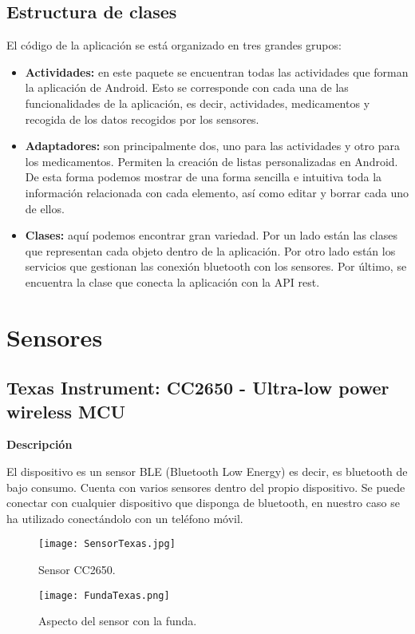 \documentclass[11pt,spanish]{article}
\begin{document}
\subsection{Estructura de clases}
El código de la aplicación se está organizado en tres grandes grupos:

\begin{itemize}
	\item {\bf Actividades: } en este paquete se encuentran todas las actividades que forman la aplicación de Android. Esto se corresponde con cada una de las funcionalidades de la aplicación, es decir, actividades, medicamentos y recogida de los datos recogidos por los sensores.
    \item {\bf Adaptadores: } son principalmente dos, uno para las actividades y otro para los medicamentos. Permiten la creación de listas personalizadas en Android. De esta forma podemos mostrar de una forma sencilla e intuitiva toda la información relacionada con cada elemento, así como editar y borrar cada uno de ellos.
    \item {\bf Clases: } aquí podemos encontrar gran variedad. Por un lado están las clases que representan cada objeto dentro de la aplicación. Por otro lado están los servicios que gestionan las conexión bluetooth con los sensores. Por último, se encuentra la clase que conecta la aplicación con la API rest.
\end{itemize}

\section{Sensores}
\subsection{Texas Instrument: CC2650 - Ultra-low power wireless MCU}
{\bf Descripción}
\newline

El dispositivo es un sensor BLE (Bluetooth Low Energy) es decir, es bluetooth de bajo consumo. Cuenta con varios sensores dentro del propio dispositivo. Se puede conectar con cualquier dispositivo que disponga de bluetooth, en nuestro caso se ha utilizado conectándolo con un teléfono móvil. 

\begin{figure}[h!]
  \centering
  \texttt{[image: SensorTexas.jpg]}
  \caption{Sensor CC2650.}
\end{figure}

\begin{figure}[h!]
  \centering
  \texttt{[image: FundaTexas.png]}
  \caption{Aspecto del sensor con la funda.}
\end{figure}
\end{document}
